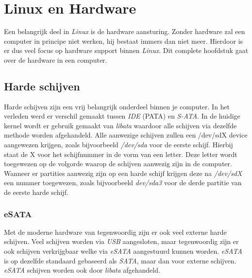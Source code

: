 %
%
%
%

\chapter{Linux en Hardware}
Een belangrijk deel in \emph{Linux} is de hardware aansturing. Zonder hardware zal een computer in principe niet werken, hij bestaat immers dan niet meer. Hierdoor is er dus veel focus op hardware support binnen \emph{Linux}. Dit complete hoofdstuk gaat over de hardware in een computer.

\section{Harde schijven}
Harde schijven zijn een vrij belangrijk onderdeel binnen je computer. In het verleden werd er verschil gemaakt tussen \emph{IDE} (PATA) en \emph{S-ATA}. In de huidige kernel wordt er gebruik gemaakt van \emph{libata} waardoor alle schijven via dezelfde methode worden afgehandeld. Alle aanwezige schijven zullen een /dev/sdX device aangewezen krijgen, zoals bijvoorbeeld \emph{/dev/sda} voor de eerste schijf. Hierbij staat de X voor het schijfnummer in de vorm van een letter. Deze letter wordt toegewezen op de volgorde waarop  de schijven aanwezig zijn in de computer.
Wanneer er partities aanwezig zijn op een harde schijf krijgen deze na \emph{/dev/sdX} een nummer toegewezen, zoals bijvoorbeeld \emph{dev/sda3} voor de derde partitie van de eerste harde schijf.

\subsection{eSATA}
Met de moderne hardware van tegenwoordig zijn er ook veel externe harde schijven. Veel schijven worden via \emph{USB} aangesloten, maar tegenwoordig zijn er ook schijven verkrijgbaar welke via \emph{eSATA} aangestuurd kunnen worden. \emph{eSATA} is op dezelfde standaard gebaseerd als \emph{SATA}, maar dan voor externe schijven. \emph{eSATA} schijven worden ook door \emph{libata} afgehandeld.

